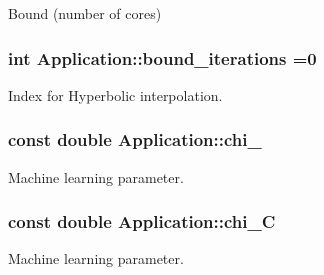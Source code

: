 Bound (number of cores) 

\hypertarget{classApplication_aa8ce75259c9f7e5a80bad43ff963a2a8}{
\subsubsection[{bound\-\_\-iterations}]{\setlength{\rightskip}{0pt plus 5cm}int Application\-::bound\-\_\-iterations =0\hspace{0.3cm}{\ttfamily [private]}}}\label{classApplication_aa8ce75259c9f7e5a80bad43ff963a2a8}


Index for Hyperbolic interpolation. 

\hypertarget{classApplication_a6066fad4c229a6035652efd712d0d78c}{
\subsubsection[{chi\-\_\-0}]{\setlength{\rightskip}{0pt plus 5cm}const double Application\-::chi\-\_\hspace{0.3cm}{\ttfamily [private]}}}\label{classApplication_a6066fad4c229a6035652efd712d0d78c}


Machine learning parameter. 

\hypertarget{classApplication_a73d8a1604a2b2c99b14db1c8bd9c2798}{
\subsubsection[{chi\-\_\-\-C}]{\setlength{\rightskip}{0pt plus 5cm}const double Application\-::chi\-\_\-\-C\hspace{0.3cm}{\ttfamily [private]}}}\label{classApplication_a73d8a1604a2b2c99b14db1c8bd9c2798}


Machine learning parameter. 

